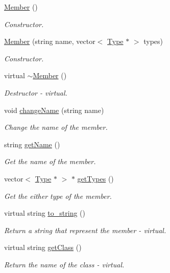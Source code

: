 \begin{DoxyCompactItemize}
\item 
\hypertarget{classMember_a44241aa6aa9b792b550d9cc29e7ad050}{\hyperlink{classMember_a44241aa6aa9b792b550d9cc29e7ad050}{Member} ()}\label{classMember_a44241aa6aa9b792b550d9cc29e7ad050}

\begin{DoxyCompactList}\small\item\em Constructor. \end{DoxyCompactList}\item 
\hyperlink{classMember_a932fbfb630620b979b19f24a4dc34288}{Member} (string name, vector$<$ \hyperlink{classType}{Type} $\ast$ $>$ types)
\begin{DoxyCompactList}\small\item\em Constructor. \end{DoxyCompactList}\item 
\hypertarget{classMember_a4f5d7cb8788247f65f10b5b81be4a4ab}{virtual \hyperlink{classMember_a4f5d7cb8788247f65f10b5b81be4a4ab}{$\sim$\+Member} ()}\label{classMember_a4f5d7cb8788247f65f10b5b81be4a4ab}

\begin{DoxyCompactList}\small\item\em Destructor -\/ virtual. \end{DoxyCompactList}\item 
void \hyperlink{classMember_a1ada18dd2a55fd384173796936fe286a}{change\+Name} (string name)
\begin{DoxyCompactList}\small\item\em Change the name of the member. \end{DoxyCompactList}\item 
string \hyperlink{classMember_acbe6a0cd073a21fb0f1da2cbfb260952}{get\+Name} ()
\begin{DoxyCompactList}\small\item\em Get the name of the member. \end{DoxyCompactList}\item 
vector$<$ \hyperlink{classType}{Type} $\ast$ $>$ $\ast$ \hyperlink{classMember_a97087e4d42f7a4e5c0d0818748ebb614}{get\+Types} ()
\begin{DoxyCompactList}\small\item\em Get the either type of the member. \end{DoxyCompactList}\item 
virtual string \hyperlink{classMember_aaa0028059dd87706188ee670bd28e4f2}{to\+\_\+string} ()
\begin{DoxyCompactList}\small\item\em Return a string that represent the member -\/ virtual. \end{DoxyCompactList}\item 
virtual string \hyperlink{classMember_a7178ead1b2f1daa5fc5f993281ec90a4}{get\+Class} ()
\begin{DoxyCompactList}\small\item\em Return the name of the class -\/ virtual. \end{DoxyCompactList}\end{DoxyCompactItemize}
